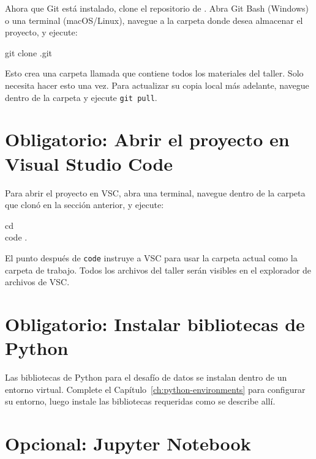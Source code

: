 \vs

Ahora que Git está instalado, clone el repositorio de \ProjectName{}.
Abra Git Bash (Windows) o una terminal (macOS/Linux),
navegue a la carpeta donde desea almacenar el proyecto, y ejecute:

{\ttfamily \noindent
git clone \ProjectGit.git
}

Esto crea una carpeta llamada \texttt{\ProjectFolder} que contiene todos
los materiales del taller. Solo necesita hacer esto una vez. Para actualizar su
copia local más adelante, navegue dentro de la carpeta y ejecute \texttt{git pull}.

\section{Obligatorio: Abrir el proyecto \ProjectName{} en Visual Studio Code}\label{sec:vscstart}

Para abrir el proyecto \ProjectName{} en VSC, abra una terminal, navegue dentro de la
carpeta \texttt{\ProjectFolder} que clonó en la sección anterior,
y ejecute:

{\ttfamily \noindent
cd \ProjectFolder \\
code .
}

El punto después de \texttt{code} instruye a VSC para usar la carpeta actual
como la carpeta de trabajo. Todos los archivos del taller serán visibles en el
explorador de archivos de VSC.

\section{Obligatorio: Instalar bibliotecas de Python}\label{sec:libraries}

Las bibliotecas de Python para el desafío de datos se instalan dentro de un entorno
virtual. Complete el Capítulo~\ref{ch:python-environments} para configurar
su entorno, luego instale las bibliotecas requeridas como se describe allí.

\section{Opcional: Jupyter Notebook}\label{sec:jupyter}

